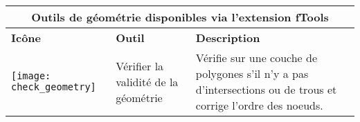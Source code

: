 \begin{table}[ht]
\centering

\begin{tabular}{|m{1cm}|m{3cm}|m{9cm}|}
 \hline \multicolumn{3}{|c|}{\textbf{Outils de géométrie disponibles via l'extension fTools}} \\
 \hline \textbf{Icône} & \textbf{Outil} & \textbf{Description} \\
 \hline \texttt{[image: check\_geometry]} & Vérifier la validité de la géométrie & Vérifie sur une couche de polygones s'il n'y a pas d'intersections ou de trous et corrige l'ordre des noeuds. \\

\end{tabular}
\end{table}

